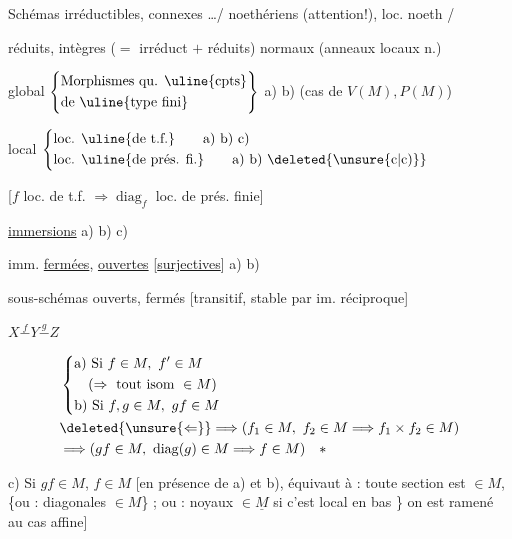 Schémas irréductibles, connexes \ldots / noethériens (attention!), loc. noeth /

réduits, intègres ($={}$ irréduct $+$ réduits) normaux  (anneaux locaux n.) 

global $\left\{\begin{aligned}&\text{Morphismes qu. \uline{cpts}}\\&\text{de \uline{type fini}}\end{aligned}\right\}$ a) b) (cas de $V(M),P(M)$)

local $\left\{\begin{aligned}&\text{loc. \uline{de t.f.}}\qquad\text{a) b) c)}\\&\text{loc. \uline{de prés. fi.}}\qquad\text{a) b) }\deleted{\unsure{\text{c}|\text{c)}}}\end{aligned}\right.$

[$f$  loc. de t.f. $\Rightarrow\operatorname{diag}_f$ loc. de prés. finie]

\uline{immersions} \qquad a) b) c)

imm. \uline{fermées}, \uline{ouvertes} [\uline{surjectives}] a) b)

sous-schémas ouverts, fermés [transitif, stable par im. réciproque]


$X\overset{f}{\mathrel{-}}Y\overset{g}{\mathrel{-}}Z$

\[
\begin{aligned}
 &\left\{\begin{aligned}
 &\text{a) Si } f\in M,\ f'\in M\\
 &\quad(\Rightarrow\text{ tout isom }\in M)\\
 &\text{b) Si }f,g\in M,\ gf\in M
 \end{aligned}\right.\\
 &\deleted{\unsure{\Leftarrow}}\Longrightarrow(f_1\in M,\ f_2\in M\Longrightarrow f_1\times f_2\in M)\\
 &\Longrightarrow(gf\in M,\ \operatorname{diag}(g)\in M\Longrightarrow f\in M)\quad *
\end{aligned}
\]

c) Si $gf\in M$, $f\in M$ [en présence de a) et b), équivaut à : toute section est $\in M$, \{ou : diagonales $\in M$\} ; ou : noyaux $\in\underline{M}$ si c'est local en bas  \} on est ramené au cas affine]

